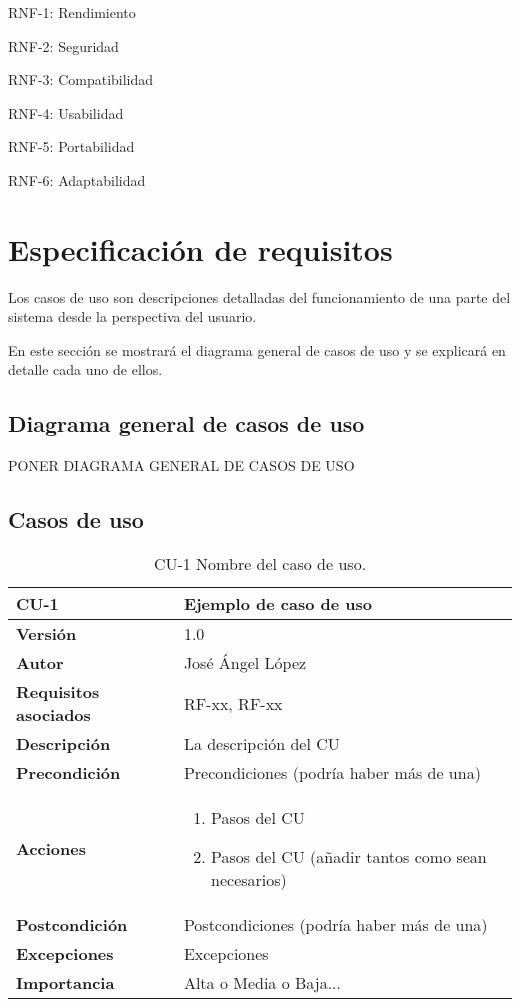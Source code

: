 RNF-1: Rendimiento

RNF-2: Seguridad

RNF-3: Compatibilidad

RNF-4: Usabilidad

RNF-5: Portabilidad

RNF-6: Adaptabilidad

\section{Especificación de requisitos}

Los casos de uso son descripciones detalladas del funcionamiento de una parte del sistema desde la perspectiva del usuario.

En este sección se mostrará el diagrama general de casos de uso y se explicará en detalle cada uno de ellos.

\subsection{Diagrama general de casos de uso}

PONER DIAGRAMA GENERAL DE CASOS DE USO

\subsection{Casos de uso}

\begin{table}[p]
	\centering
	\begin{tabularx}{\linewidth}{ p{} p{} }
		\toprule
		\textbf{CU-1}    & \textbf{Ejemplo de caso de uso}\\
		\toprule
		\textbf{Versión}              & 1.0    \\
		\textbf{Autor}                & José Ángel López \\
		\textbf{Requisitos asociados} & RF-xx, RF-xx \\
		\textbf{Descripción}          & La descripción del CU \\
		\textbf{Precondición}         & Precondiciones (podría haber más de una) \\
		\textbf{Acciones}             &
		\begin{enumerate}
			\def\labelenumi{\arabic{enumi}.}
			\tightlist
			\item Pasos del CU
			\item Pasos del CU (añadir tantos como sean necesarios)
		\end{enumerate}\\
		\textbf{Postcondición}        & Postcondiciones (podría haber más de una) \\
		\textbf{Excepciones}          & Excepciones \\
		\textbf{Importancia}          & Alta o Media o Baja... \\
		\bottomrule
	\end{tabularx}
	\caption{CU-1 Nombre del caso de uso.}
\end{table}